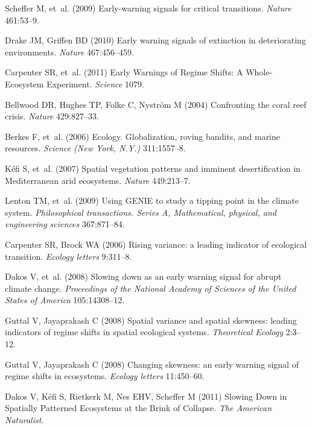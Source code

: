 \documentclass{pnastwo}
\begin{document}
\begin{article}
\begin{thebibliography}{10}
Scheffer M, {et~al.}
\newblock (2009) {Early-warning signals for critical transitions.}
\newblock \emph{Nature} 461:53--9.

Drake JM, Griffen BD
\newblock (2010) {Early warning signals of extinction in deteriorating
  environments}.
\newblock \emph{Nature} 467:456--459.

Carpenter SR, {et~al.}
\newblock (2011) {Early Warnings of Regime Shifts: A Whole-Ecosystem
  Experiment}.
\newblock \emph{Science} 1079.

Bellwood DR, Hughes TP, Folke C, Nystr\"{o}m M
\newblock (2004) {Confronting the coral reef crisis.}
\newblock \emph{Nature} 429:827--33.

Berkes F, {et~al.}
\newblock (2006) {Ecology. Globalization, roving bandits, and marine
  resources.}
\newblock \emph{Science (New York, N.Y.)} 311:1557--8.

K\'{e}fi S, {et~al.}
\newblock (2007) {Spatial vegetation patterns and imminent desertification in
  Mediterranean arid ecosystems.}
\newblock \emph{Nature} 449:213--7.

Lenton TM, {et~al.}
\newblock (2009) {Using GENIE to study a tipping point in the climate system.}
\newblock \emph{Philosophical transactions. Series A, Mathematical, physical,
  and engineering sciences} 367:871--84.

Carpenter SR, Brock WA
\newblock (2006) {Rising variance: a leading indicator of ecological
  transition.}
\newblock \emph{Ecology letters} 9:311--8.

Dakos V, {et~al.}
\newblock (2008) {Slowing down as an early warning signal for abrupt climate
  change.}
\newblock \emph{Proceedings of the National Academy of Sciences of the United
  States of America} 105:14308--12.

Guttal V, Jayaprakash C
\newblock (2008) {Spatial variance and spatial skewness: leading indicators of
  regime shifts in spatial ecological systems}.
\newblock \emph{Theoretical Ecology} 2:3--12.

Guttal V, Jayaprakash C
\newblock (2008) {Changing skewness: an early warning signal of regime shifts
  in ecosystems.}
\newblock \emph{Ecology letters} 11:450--60.

Dakos V, K\'{e}fi S, Rietkerk M, Nes EHV, Scheffer M
\newblock (2011) {Slowing Down in Spatially Patterned Ecosystems at the Brink
  of Collapse}.
\newblock \emph{The American Naturalist}.


\end{thebibliography}
\end{article}
\end{document}

